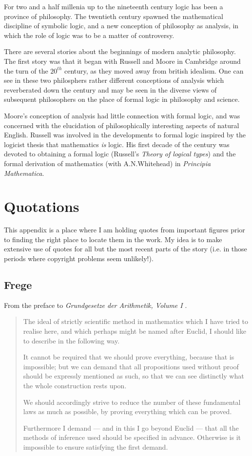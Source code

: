 For two and a half millenia up to the nineteenth century logic has been a province of philosophy.
The twentieth century spawned the mathematical discipline of symbolic logic, and a new conception of philosophy as analysis, in which the role of logic was to be a matter of controversy.

There are several stories about the beginnings of modern analytic philosophy.
The first story was that it began with Russell and Moore in Cambridge around the turn of the $20^{th}$ century, as they moved away from british idealism.
One can see in these two philosphers rather different conceptions of analysis which reverberated down the century and may be seen in the diverse views of subsequent philosophers on the place of formal logic in philosophy and science.

Moore's conception of analysis had little connection with formal logic, and was concerned with the elucidation of philosophically interesting aspects of natural English.
Russell was involved in the developments to formal logic inspired by the logicist thesis that mathematics \emph{is} logic.
His first decade of the century was devoted to obtaining a formal logic (Russell's \emph{Theory of logical types}\cite{russell1908}) and the formal derivation of mathematics (with A.N.Whitehead) in \emph{Principia Mathematica}\cite{russell10}.

\chapter{Quotations}

This appendix is a place where I am holding quotes from important figures prior to finding the right place to locate them in the work.
My idea is to make extensive use of quotes for all but the most recent parts of the story (i.e. in those periods where copyright problems seem unlikely!).

\section{Frege}

From the preface to \emph{Grundgesetze der Arithmetik, Volume I} \cite{frege1893,frege1903}.

\begin{quote}
The ideal of strictly scientific method in mathematics which I have tried to realise here, and which perhaps might be named after Euclid, I should like to describe in the following way.

It cannot be required that we should prove everything, because that is impossible; but we can demand that all propositions used without proof should be expressly mentioned as such, so that we can see distinctly what the whole construction rests upon.
	
We should accordingly strive to reduce the number of these fundamental laws as much as possible, by proving everything which can be proved.
	
Furthermore I demand --- and in this I go beyond Euclid --- that all the methods of inference used should be specified in advance.
Otherwise is it impossible to ensure satisfying the first demand.
\end{quote}

